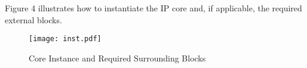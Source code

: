 Figure 4 illustrates how to instantiate the IP core and, if applicable, the
required external blocks.

\begin{figure}[!htbp]
    \centerline{\texttt{[image: inst.pdf]}}
    \vspace{0cm}\caption{Core Instance and Required Surrounding Blocks}
    \label{fig:inst}
\end{figure}



